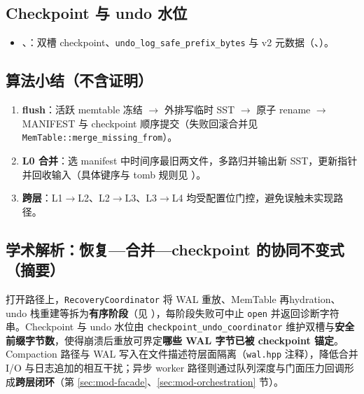 \subsection{Checkpoint 与 undo 水位}

\begin{itemize}
  \item {}、：双槽 checkpoint、\texttt{undo\_log\_safe\_prefix\_bytes} 与 v2 元数据（、）。
\end{itemize}

\subsection{算法小结（不含证明）}

\begin{enumerate}
  \item \textbf{flush}：活跃 memtable 冻结 $\rightarrow$ 外排写临时 SST $\rightarrow$ 原子 rename $\rightarrow$ MANIFEST 与 checkpoint 顺序提交（失败回滚合并见 \texttt{MemTable::merge\_missing\_from}）。
  \item \textbf{L0 合并}：选 manifest 中时间序最旧两文件，多路归并输出新 SST，更新指针并回收输入（具体键序与 tomb 规则见 ）。
  \item \textbf{跨层}：L1$\rightarrow$L2、L2$\rightarrow$L3、L3$\rightarrow$L4 均受配置位门控，避免误触未实现路径。
\end{enumerate}

\subsection{学术解析：恢复—合并—checkpoint 的协同不变式（摘要）}

打开路径上，\texttt{RecoveryCoordinator} 将 WAL 重放、MemTable 再hydration、undo 栈重建等拆为\textbf{有序阶段}（见 ），每阶段失败可中止 \texttt{open} 并返回诊断字符串。Checkpoint 与 undo 水位由 \texttt{checkpoint\_undo\_coordinator} 维护双槽与\textbf{安全前缀字节数}，使得崩溃后重放可界定\textbf{哪些 WAL 字节已被 checkpoint 锚定}。Compaction 路径与 WAL 写入在文件描述符层面隔离（\texttt{wal.hpp} 注释），降低合并 I/O 与日志追加的相互干扰；异步 worker 路径则通过队列深度与门面压力回调形成\textbf{跨层闭环}（第 \ref{sec:mod-facade}、\ref{sec:mod-orchestration} 节）。


